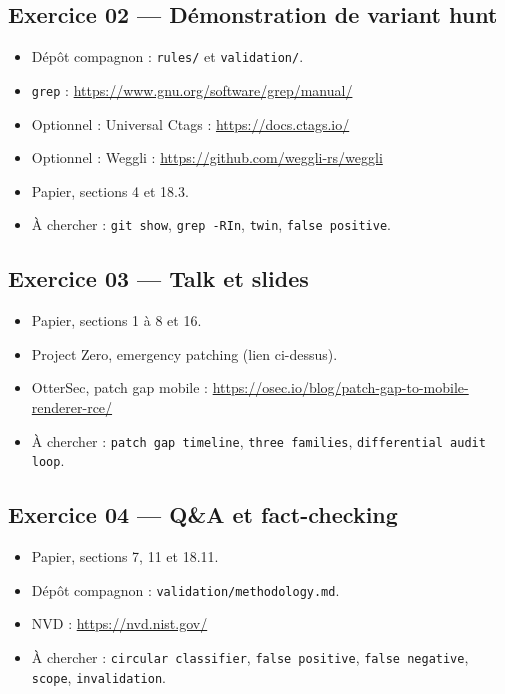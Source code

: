 \documentclass{training}
\begin{document}
\subsection*{Exercice 02 --- Démonstration de variant hunt}
\begin{itemize}
  \item Dépôt compagnon : \texttt{rules/} et \texttt{validation/}.
  \item \texttt{grep} : \url{https://www.gnu.org/software/grep/manual/}
  \item Optionnel : Universal Ctags : \url{https://docs.ctags.io/}
  \item Optionnel : Weggli : \url{https://github.com/weggli-rs/weggli}
  \item Papier, sections 4 et 18.3.
  \item À chercher : \texttt{git show}, \texttt{grep -RIn},
        \texttt{twin}, \texttt{false positive}.
\end{itemize}

\subsection*{Exercice 03 --- Talk et slides}
\begin{itemize}
  \item Papier, sections 1 à 8 et 16.
  \item Project Zero, emergency patching (lien ci-dessus).
  \item OtterSec, patch gap mobile :
        \url{https://osec.io/blog/patch-gap-to-mobile-renderer-rce/}
  \item À chercher : \texttt{patch gap timeline}, \texttt{three families},
        \texttt{differential audit loop}.
\end{itemize}

\subsection*{Exercice 04 --- Q\&A et fact-checking}
\begin{itemize}
  \item Papier, sections 7, 11 et 18.11.
  \item Dépôt compagnon : \texttt{validation/methodology.md}.
  \item NVD : \url{https://nvd.nist.gov/}
  \item À chercher : \texttt{circular classifier}, \texttt{false positive},
        \texttt{false negative}, \texttt{scope}, \texttt{invalidation}.
\end{itemize}
\end{document}
